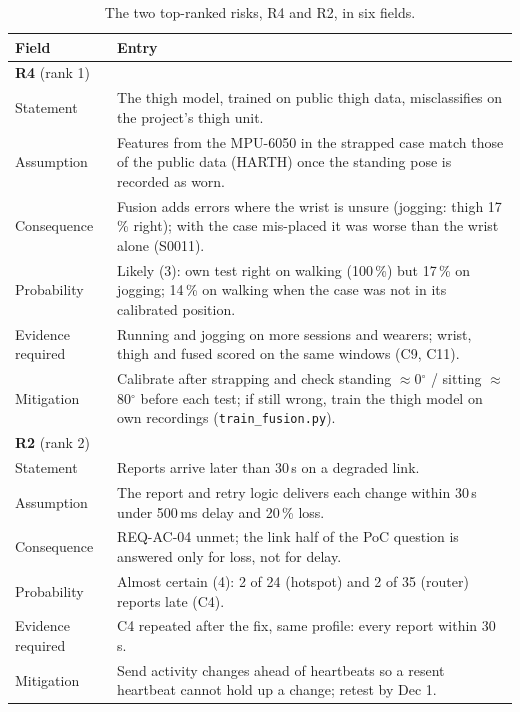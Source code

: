 \documentclass[conference]{IEEEtran}
\begin{document}
\begin{table}[!t]
\centering
\scriptsize
\caption{The two top-ranked risks, R4 and R2, in six fields.}
\label{tab:toprisk}
\begin{tabular}{p{1.5cm}p{6.0cm}}
\toprule
\textbf{Field} & \textbf{Entry} \\
\midrule
\multicolumn{2}{l}{\textbf{R4} (rank 1)} \\
Statement & The thigh model, trained on public thigh data, misclassifies on the project's thigh unit. \\
Assumption & Features from the MPU-6050 in the strapped case match those of the public data (HARTH) once the standing pose is recorded as worn. \\
Consequence & Fusion adds errors where the wrist is unsure (jogging: thigh 17\,\% right); with the case mis-placed it was worse than the wrist alone (S0011). \\
Probability & Likely (3): own test right on walking (100\,\%) but 17\,\% on jogging; 14\,\% on walking when the case was not in its calibrated position. \\
Evidence required & Running and jogging on more sessions and wearers; wrist, thigh and fused scored on the same windows (C9, C11). \\
Mitigation & Calibrate after strapping and check standing $\approx$0$^\circ$ / sitting $\approx$80$^\circ$ before each test; if still wrong, train the thigh model on own recordings (\texttt{train\_fusion.py}). \\
\midrule
\multicolumn{2}{l}{\textbf{R2} (rank 2)} \\
Statement & Reports arrive later than 30\,s on a degraded link. \\
Assumption & The report and retry logic delivers each change within 30\,s under 500\,ms delay and 20\,\% loss. \\
Consequence & REQ-AC-04 unmet; the link half of the PoC question is answered only for loss, not for delay. \\
Probability & Almost certain (4): 2 of 24 (hotspot) and 2 of 35 (router) reports late (C4). \\
Evidence required & C4 repeated after the fix, same profile: every report within 30\,s. \\
Mitigation & Send activity changes ahead of heartbeats so a resent heartbeat cannot hold up a change; retest by Dec 1. \\
\bottomrule
\end{tabular}
\end{table}
\end{document}
